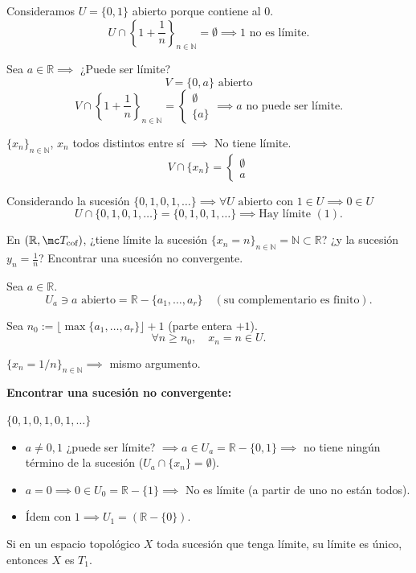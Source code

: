 \begin{sol}
Consideramos $U = \{0, 1\}$ abierto porque contiene al $0$.
\[
    U \cap \left\{1 + \frac{1}{n}\right\}_{n \in \mathbb{N}} = \emptyset \implies 1 \text{ no es límite} \text{}.
\]

Sea $a \in \mathbb{R} \implies$ ¿Puede ser límite?
\[
    V = \{0, a\} \text{ abierto} \text{}
\]
\[
    V \cap \left\{1 + \frac{1}{n}\right\}_{n \in \mathbb{N}} = \begin{cases} \emptyset \\ \{a\} \end{cases} \implies a \text{ no puede ser límite} \text{}.
\]

$\{x_n\}_{n \in \mathbb{N}}$, $x_n$ todos distintos entre sí $\implies$ No tiene límite.
\[
    V \cap \{x_n\} = \begin{cases} \emptyset \\ a \end{cases} \text{}
\]
 
Considerando la sucesión $\{0, 1, 0, 1, \ldots\} \implies \forall U \text{ abierto con } 1 \in U \implies 0 \in U$
\[
    U \cap \{0, 1, 0, 1, \ldots\} = \{0, 1, 0, 1, \ldots\} \implies \text{Hay límite } (1) \text{}.
\]
\end{sol}

\bigskip

\begin{ejer}[67]
En $(\mathbb{R}, \mc T_{\text{cof}})$, ¿tiene límite la sucesión $\{x_n = n\}_{n \in \mathbb{N}} = \mathbb{N} \subset \mathbb{R}$? ¿y la sucesión $y_n = \frac{1}{n}$? Encontrar una sucesión no convergente.
\end{ejer}
\begin{sol}
Sea $a \in \mathbb{R}$.
\[
    U_a \ni a \text{ abierto} = \mathbb{R} - \{a_1, \ldots, a_r\} \quad (\text{su complementario es finito}) \text{}.
\]

Sea $n_0 := \lfloor \max\{a_1, \ldots, a_r\} \rfloor + 1$ (parte entera $+ 1$).
\[
    \forall n \ge n_0, \quad x_n = n \in U \text{}.
\]

$\{x_n = 1/n\}_{n \in \mathbb{N}} \implies$ mismo argumento.

\medskip
\textbf{Encontrar una sucesión no convergente:}

$\{0, 1, 0, 1, 0, 1, \ldots\}$

\begin{itemize}
    \item $a \ne 0, 1$ ¿puede ser límite? $\implies a\in U_a = \mathbb{R} - \{0, 1\} \implies$ no tiene ningún término de la sucesión ($U_a \cap \{x_n\} = \emptyset$).
    \item $a = 0 \implies 0 \in U_0 = \mathbb{R} - \{1\} \implies$ No es límite (a partir de uno no están todos).
    \item Ídem con $1 \implies U_1 = (\mathbb{R} - \{0\})$.
\end{itemize}
\end{sol}
\begin{ejer}[70]
Si en un espacio topológico $X$ toda sucesión que tenga límite, su límite es único, entonces $X$ es $T_1$.
\end{ejer}

